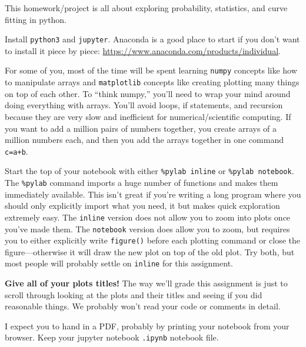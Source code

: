 \documentclass[11pt]{hmcpset}
\begin{document}

This homework/project is all about exploring probability, statistics, and curve fitting in python.

Install \texttt{python3} and \texttt{jupyter}. Anaconda is a good place to start if you don't want to install it piece by piece: \url{https://www.anaconda.com/products/individual}.

For some of you, most of the time will be spent learning \texttt{numpy} concepts like how to manipulate arrays and \texttt{matplotlib} concepts like creating plotting many things on top of each other. To ``think numpy,'' you'll need to wrap your mind around doing everything with arrays. You'll avoid loops, if statements, and recursion because they are very slow and inefficient for numerical/scientific computing. If you want to add a million pairs of numbers together, you create arrays of a million numbers each, and then you add the arrays together in one command \texttt{c=a+b}.

Start the top of your notebook with either \texttt{\%pylab inline} or \texttt{\%pylab notebook}. The \texttt{\%pylab} command imports a huge number of functions and makes them immediately available. This isn't great if you're writing a long program where you should only explicitly import what you need, it but makes quick exploration extremely easy. The \texttt{inline} version does not allow you to zoom into plots once you've made them. The \texttt{notebook} version does allow you to zoom, but requires you to either explicitly write \texttt{figure()} before each plotting command or close the figure---otherwise it will draw the new plot on top of the old plot. Try both, but most people will probably settle on \texttt{inline} for this assignment.

\textbf{Give all of your plots titles!} The way we'll grade this assignment is just to scroll through looking at the plots and their titles and seeing if you did reasonable things. We probably won't read your code or comments in detail.

I expect you to hand in a  PDF, probably by printing your notebook from your browser. Keep your jupyter notebook \texttt{.ipynb} notebook file.
\end{document}
